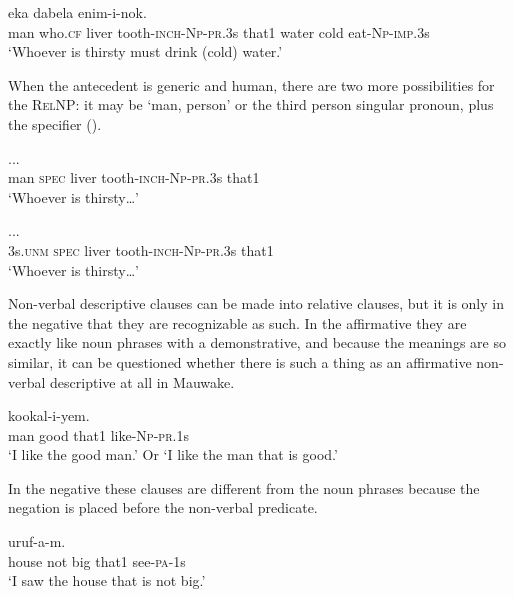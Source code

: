 \ea%
\label{ex:8:x1563}
  eka  dabela enim-i-nok.\\
man  who.\textsc{cf} liver  tooth-\textsc{inch}-\textsc{Np}-\textsc{pr}.3s  that1  water  cold eat-\textsc{Np}-\textsc{imp}.3s\\
\glt`Whoever is thirsty must drink (cold) water.'
\z


When the antecedent is generic and human, there are two more possibilities for the \textsc{RelNP}: it may be  `man, person' or the third person singular pronoun, plus the specifier  (). 

\ea%
\label{ex:8:x1564}
  ... \\
man  \textsc{spec} liver  tooth-\textsc{inch}-\textsc{Np}-\textsc{pr}.3s  that1\\
\glt`Whoever is thirsty{\dots}'
\z


\ea%
\label{ex:8:x1565}
  ... \\
3s.\textsc{unm} \textsc{spec} liver tooth-\textsc{inch}-\textsc{Np}-\textsc{pr}.3s  that1\\
\glt`Whoever is thirsty{\dots}'
\z


Non-verbal descriptive clauses can be made into relative clauses, but it is only in the negative that they are recognizable as such. In the affirmative they are exactly like noun phrases with a demonstrative, and because the meanings are so similar, it can be questioned whether there is such a thing as an affirmative non-verbal descriptive  at all in Mauwake.  

\ea%
\label{ex:8:x1550}
  kookal-i-yem.\\
man  good  that1  like-\textsc{Np}-\textsc{pr}.1s\\
\glt`I like the good man.' Or `I like the man that is good.'
\z


In the negative these clauses are different from the noun phrases because the negation is placed before the non-verbal predicate.

\ea%
\label{ex:8:x1551}
  uruf-a-m. \\
house  not  big  that1  see-\textsc{pa}-1s\\
\glt`I saw the house that is not big.'
\z


